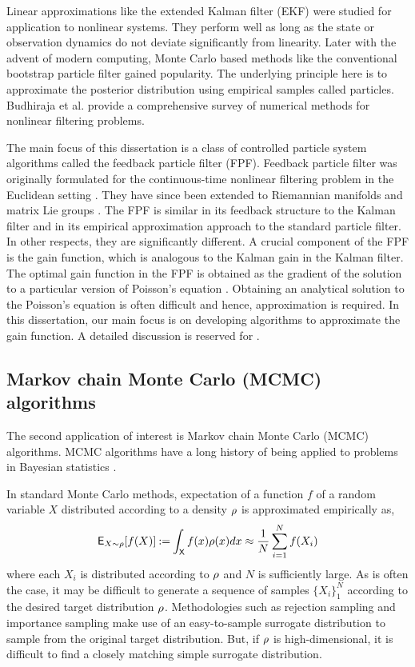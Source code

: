 Linear approximations like the extended Kalman filter (EKF) were studied for application to nonlinear systems. They perform well as long as the state or observation dynamics do not deviate significantly from linearity. Later with the advent of modern computing, Monte Carlo based methods like the conventional bootstrap particle filter gained popularity. The underlying principle here is to approximate the posterior distribution using empirical samples called particles. Budhiraja et al. \cite{budchelee07} provide a comprehensive survey of numerical methods for nonlinear filtering problems. 

The main focus of this dissertation is a class of controlled particle system algorithms called the feedback particle filter (FPF). Feedback particle filter was originally formulated for the continuous-time nonlinear filtering problem in the Euclidean setting \cite{yanmehmey13}. They have since been extended to Riemannian manifolds and matrix Lie groups \cite{zhatagmeh16}. The FPF is similar in its feedback structure to the Kalman filter and in its empirical approximation approach to the standard particle filter. In other respects, they are significantly different. A crucial component of the FPF is the gain function, which is analogous to the Kalman gain in the Kalman filter. The optimal gain function in the FPF is obtained as the gradient of the solution to a particular version of Poisson's equation \cite{yanmehmey13, laumehmeyrag14}. Obtaining an analytical solution to the Poisson's equation is often difficult and hence, approximation is required. In this dissertation, our main focus is on developing algorithms to approximate the gain function. A detailed discussion is reserved for . 

\subsection{Markov chain Monte Carlo (MCMC) algorithms}
\label{s:mcmc}
The second application of interest is Markov chain Monte Carlo (MCMC) algorithms. MCMC algorithms have a long history of being applied to problems in Bayesian statistics \cite{}. 

In standard Monte Carlo methods, expectation of a function $f$ of a random variable $X$ distributed according to a density $\rho$ is approximated empirically as,
\begin{equation}
 \Expect_{X \sim \pr} [f(X)] \eqdef \int_\state f(x)\pr(x) dx \approx \frac{1}{N} \sum_{i=1}^N f(X_i)
 \label{e:emp_avg} 
\end{equation}
where each $X_i$ is distributed according to $\rho$ and $N$ is sufficiently large. As is often the case, it may be difficult to generate a sequence of samples $\{X_i\}_1^N$ according to the desired target distribution $\rho$. Methodologies such as rejection sampling and importance sampling make use of an easy-to-sample surrogate distribution to sample from the original target distribution. But, if $\rho$ is high-dimensional, it is difficult to find a closely matching simple surrogate distribution. 


